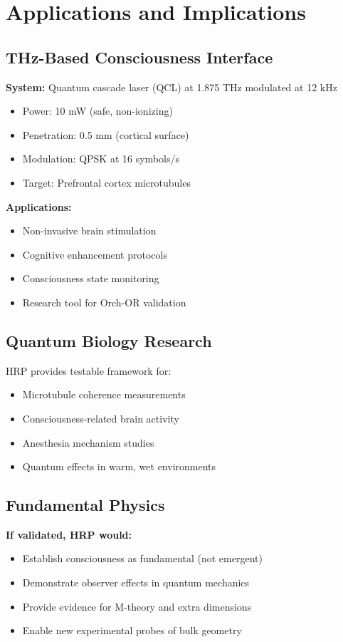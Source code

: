 \section{Applications and Implications}

\subsection{THz-Based Consciousness Interface}

\textbf{System:} Quantum cascade laser (QCL) at 1.875 THz modulated at 12 kHz
\begin{itemize}
\item Power: 10 mW (safe, non-ionizing)
\item Penetration: 0.5 mm (cortical surface)
\item Modulation: QPSK at 16 symbols/s
\item Target: Prefrontal cortex microtubules
\end{itemize}

\textbf{Applications:}
\begin{itemize}
\item Non-invasive brain stimulation
\item Cognitive enhancement protocols
\item Consciousness state monitoring
\item Research tool for Orch-OR validation
\end{itemize}

\subsection{Quantum Biology Research}

HRP provides testable framework for:
\begin{itemize}
\item Microtubule coherence measurements
\item Consciousness-related brain activity
\item Anesthesia mechanism studies
\item Quantum effects in warm, wet environments
\end{itemize}

\subsection{Fundamental Physics}

\textbf{If validated, HRP would:}
\begin{itemize}
\item Establish consciousness as fundamental (not emergent)
\item Demonstrate observer effects in quantum mechanics
\item Provide evidence for M-theory and extra dimensions
\item Enable new experimental probes of bulk geometry
\end{itemize}

